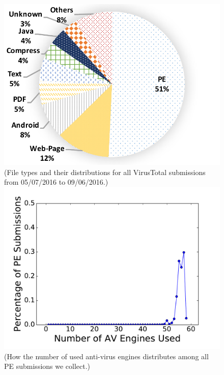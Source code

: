 \begin{figure}[!htb]
  \includegraphics[width=\linewidth]{figure/type}
{\footnotesize{(File types and their distributions for all VirusTotal submissions from 05/07/2016 to 09/06/2016.)}}
\endminipage\hfill
{}
  \includegraphics[width=\linewidth]{figure/numVendor}
  {\footnotesize{(How the number of used anti-virus engines distributes among all PE submissions we collect.)}}
\endminipage\hfill
{}%

\end{figure}
